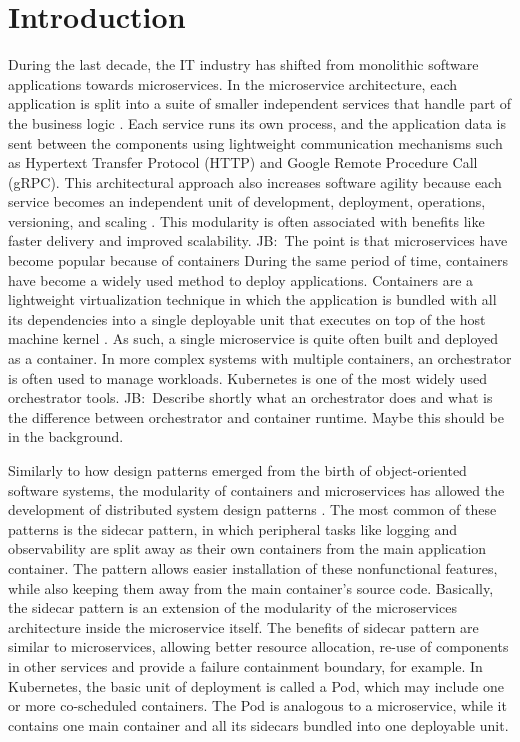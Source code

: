 \documentclass[english, 12pt, a4paper, sci, utf8, a-2b, online]{aaltothesis}
\newcommand{\mycomment}[3]{\textcolor{#1}{#2:~#3}}
\newcommand{\jb}[1]{\noindent\mycomment{aaltoRed}{JB}{#1}}
\begin{document}
\cleardoublepage

\thispagestyle{empty}

\section{Introduction} \label{sec:intro}

During the last decade, the IT industry has shifted from monolithic software applications towards microservices.
In the microservice architecture, each application is split into a suite of smaller independent services that handle part of the business logic \cite{fowler2014microservices}.
Each service runs its own process, and the application data is sent between the components using lightweight communication mechanisms such as Hypertext Transfer Protocol (HTTP) and Google Remote Procedure Call (gRPC).
This architectural approach also increases software agility because each service becomes an independent unit of development, deployment, operations, versioning, and scaling \cite{jamshidi2018microservices}.
This modularity is often associated with benefits like faster delivery and improved scalability.
\jb{The point is that microservices have become popular because of containers}
During the same period of time, containers have become a widely used method to deploy applications.
Containers are a lightweight virtualization technique in which the application is bundled with all its dependencies into a single deployable unit that executes on top of the host machine kernel \cite{bui2015analysis}.
As such, a single microservice is quite often built and deployed as a container.
In more complex systems with multiple containers, an orchestrator is often used to manage workloads.
Kubernetes is one of the most widely used orchestrator tools.
\jb{Describe shortly what an orchestrator does and what is the difference between orchestrator and container runtime. Maybe this should be in the background.}

Similarly to how design patterns emerged from the birth of object-oriented software systems, the modularity of containers and microservices has allowed the development of distributed system design patterns \cite{burns2016design}.
The most common of these patterns is the sidecar pattern, in which peripheral tasks like logging and observability are split away as their own containers from the main application container.
The pattern allows easier installation of these nonfunctional features, while also keeping them away from the main container's source code.
Basically, the sidecar pattern is an extension of the modularity of the microservices architecture inside the microservice itself.
The benefits of sidecar pattern are similar to microservices, allowing better resource allocation, re-use of components in other services and provide a failure containment boundary, for example.
In Kubernetes, the basic unit of deployment is called a Pod, which may include one or more co-scheduled containers.
The Pod is analogous to a microservice, while it contains one main container and all its sidecars bundled into one deployable unit.
\end{document}
